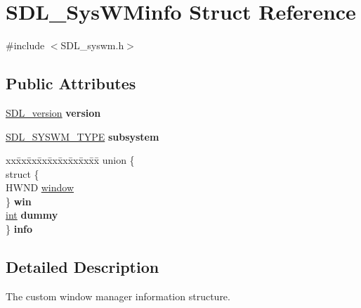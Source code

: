\hypertarget{structSDL__SysWMinfo}{}\section{S\+D\+L\+\_\+\+Sys\+W\+Minfo Struct Reference}
\label{structSDL__SysWMinfo}


{\ttfamily \#include $<$S\+D\+L\+\_\+syswm.\+h$>$}

\subsection*{Public Attributes}
\begin{DoxyCompactItemize}
\item 
\hypertarget{structSDL__SysWMinfo_ac3a70af022d4849e9ff546595e94627f}{}\hyperlink{structSDL__version}{S\+D\+L\+\_\+version} {\bfseries version}\label{structSDL__SysWMinfo_ac3a70af022d4849e9ff546595e94627f}

\item 
\hypertarget{structSDL__SysWMinfo_a438b6a06ab3ee417293c7b7fc5a23855}{}\hyperlink{SDL__syswm_8h_a064c26598287280fff2a00d6758ac4f7}{S\+D\+L\+\_\+\+S\+Y\+S\+W\+M\+\_\+\+T\+Y\+P\+E} {\bfseries subsystem}\label{structSDL__SysWMinfo_a438b6a06ab3ee417293c7b7fc5a23855}

\item 
\hypertarget{structSDL__SysWMinfo_a96639a5304141225509483baf5910439}{}\begin{tabbing}
xx\=xx\=xx\=xx\=xx\=xx\=xx\=xx\=xx\=\kill
union \{\\
\>struct \{\\
\>\>HWND \hyperlink{structSDL__SysWMinfo_af06225591ff07e837bbd037728a525b9}{window}\\
\>\} {\bfseries win}\\
\>\hyperlink{SDL__thread_8h_a6a64f9be4433e4de6e2f2f548cf3c08e}{int} {\bfseries dummy}\\
\} {\bfseries info}\label{structSDL__SysWMinfo_a96639a5304141225509483baf5910439}
\\

\end{tabbing}\end{DoxyCompactItemize}


\subsection{Detailed Description}
The custom window manager information structure.

